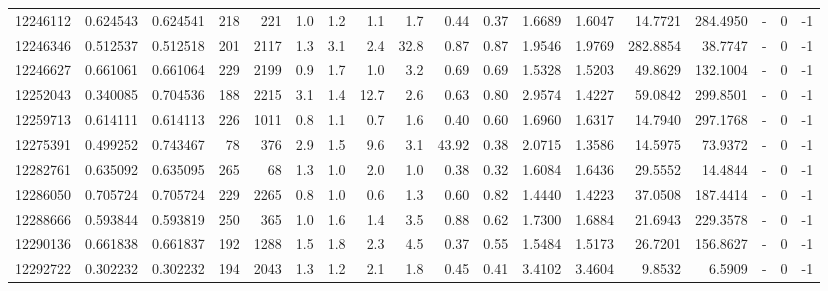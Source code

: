 \begin{tabular}{rrrrrrrrrrrrrrrlrr}
  12246112 & 0.624543 &   0.624541 &  218 &  221 &      1.0 &      1.2 &     1.1 &      1.7 &       0.44 &        0.37 &  1.6689 &  1.6047 &   14.7721 &  284.4950 &             - &        0 &         -1 \\
  12246346 & 0.512537 &   0.512518 &  201 & 2117 &      1.3 &      3.1 &     2.4 &     32.8 &       0.87 &        0.87 &  1.9546 &  1.9769 &  282.8854 &   38.7747 &             - &        0 &         -1 \\
  12246627 & 0.661061 &   0.661064 &  229 & 2199 &      0.9 &      1.7 &     1.0 &      3.2 &       0.69 &        0.69 &  1.5328 &  1.5203 &   49.8629 &  132.1004 &             - &        0 &         -1 \\
  12252043 & 0.340085 &   0.704536 &  188 & 2215 &      3.1 &      1.4 &    12.7 &      2.6 &       0.63 &        0.80 &  2.9574 &  1.4227 &   59.0842 &  299.8501 &             - &        0 &         -1 \\
  12259713 & 0.614111 &   0.614113 &  226 & 1011 &      0.8 &      1.1 &     0.7 &      1.6 &       0.40 &        0.60 &  1.6960 &  1.6317 &   14.7940 &  297.1768 &             - &        0 &         -1 \\
  12275391 & 0.499252 &   0.743467 &   78 &  376 &      2.9 &      1.5 &     9.6 &      3.1 &      43.92 &        0.38 &  2.0715 &  1.3586 &   14.5975 &   73.9372 &             - &        0 &         -1 \\
  12282761 & 0.635092 &   0.635095 &  265 &   68 &      1.3 &      1.0 &     2.0 &      1.0 &       0.38 &        0.32 &  1.6084 &  1.6436 &   29.5552 &   14.4844 &             - &        0 &         -1 \\
  12286050 & 0.705724 &   0.705724 &  229 & 2265 &      0.8 &      1.0 &     0.6 &      1.3 &       0.60 &        0.82 &  1.4440 &  1.4223 &   37.0508 &  187.4414 &             - &        0 &         -1 \\
  12288666 & 0.593844 &   0.593819 &  250 &  365 &      1.0 &      1.6 &     1.4 &      3.5 &       0.88 &        0.62 &  1.7300 &  1.6884 &   21.6943 &  229.3578 &             - &        0 &         -1 \\
  12290136 & 0.661838 &   0.661837 &  192 & 1288 &      1.5 &      1.8 &     2.3 &      4.5 &       0.37 &        0.55 &  1.5484 &  1.5173 &   26.7201 &  156.8627 &             - &        0 &         -1 \\
  12292722 & 0.302232 &   0.302232 &  194 & 2043 &      1.3 &      1.2 &     2.1 &      1.8 &       0.45 &        0.41 &  3.4102 &  3.4604 &    9.8532 &    6.5909 &             - &        0 &         -1 \\

\end{tabular}
